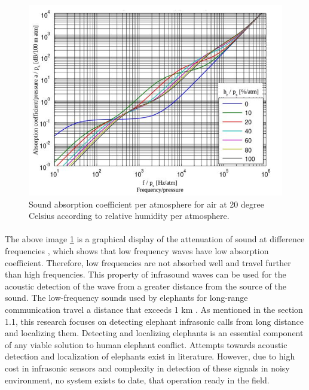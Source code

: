 \documentclass[12pt]{article}
\numberwithin{figure}{section}
\numberwithin{table}{section}
\begin{document}
\begin{figure}[H]
\centering
\includegraphics[width= 15cm]{a.png}
\caption[Attenuation of sound at difference frequencies]{Sound absorption coefficient per atmosphere for air at 20 degree Celsius according to relative humidity per atmosphere.\cite{14}}
\label{fig:logo}
\end{figure}


\paragraph{}
The above image \ref{fig:logo} is a graphical display of the attenuation of sound at difference frequencies \cite {5}, which shows that low frequency waves have low absorption coefficient. Therefore, low frequencies are not absorbed well and travel further than high frequencies. This property of infrasound waves can be used  for the acoustic detection of the wave from a greater distance from the source of the sound. The low-frequency sounds used by elephants for long-range communication travel a distance that exceeds 1 km \cite {3}. As mentioned in the section 1.1, this research focuses on detecting elephant infrasonic calls from long distance and localizing them. Detecting and localizing elephants is an essential component of any viable solution to human elephant conflict. Attempts towards acoustic detection and localization of elephants exist in literature. However, due to high cost in infrasonic sensors and complexity in detection of these signals  in noisy environment, no system exists to date, that operation ready in the field.
\end{document}
